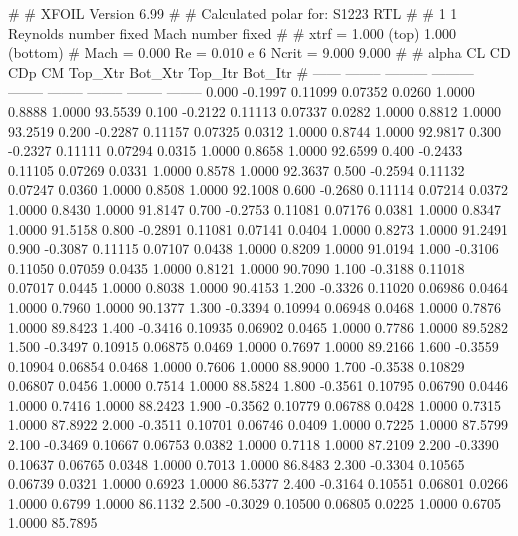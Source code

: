 #  
#       XFOIL         Version 6.99
#  
# Calculated polar for: S1223 RTL                                       
#  
# 1 1 Reynolds number fixed          Mach number fixed         
#  
# xtrf =   1.000 (top)        1.000 (bottom)  
# Mach =   0.000     Re =     0.010 e 6     Ncrit =   9.000  9.000
#  
#   alpha    CL        CD       CDp       CM     Top_Xtr  Bot_Xtr  Top_Itr  Bot_Itr
#  ------ -------- --------- --------- -------- -------- -------- -------- --------
   0.000  -0.1997   0.11099   0.07352   0.0260   1.0000   0.8888   1.0000  93.5539
   0.100  -0.2122   0.11113   0.07337   0.0282   1.0000   0.8812   1.0000  93.2519
   0.200  -0.2287   0.11157   0.07325   0.0312   1.0000   0.8744   1.0000  92.9817
   0.300  -0.2327   0.11111   0.07294   0.0315   1.0000   0.8658   1.0000  92.6599
   0.400  -0.2433   0.11105   0.07269   0.0331   1.0000   0.8578   1.0000  92.3637
   0.500  -0.2594   0.11132   0.07247   0.0360   1.0000   0.8508   1.0000  92.1008
   0.600  -0.2680   0.11114   0.07214   0.0372   1.0000   0.8430   1.0000  91.8147
   0.700  -0.2753   0.11081   0.07176   0.0381   1.0000   0.8347   1.0000  91.5158
   0.800  -0.2891   0.11081   0.07141   0.0404   1.0000   0.8273   1.0000  91.2491
   0.900  -0.3087   0.11115   0.07107   0.0438   1.0000   0.8209   1.0000  91.0194
   1.000  -0.3106   0.11050   0.07059   0.0435   1.0000   0.8121   1.0000  90.7090
   1.100  -0.3188   0.11018   0.07017   0.0445   1.0000   0.8038   1.0000  90.4153
   1.200  -0.3326   0.11020   0.06986   0.0464   1.0000   0.7960   1.0000  90.1377
   1.300  -0.3394   0.10994   0.06948   0.0468   1.0000   0.7876   1.0000  89.8423
   1.400  -0.3416   0.10935   0.06902   0.0465   1.0000   0.7786   1.0000  89.5282
   1.500  -0.3497   0.10915   0.06875   0.0469   1.0000   0.7697   1.0000  89.2166
   1.600  -0.3559   0.10904   0.06854   0.0468   1.0000   0.7606   1.0000  88.9000
   1.700  -0.3538   0.10829   0.06807   0.0456   1.0000   0.7514   1.0000  88.5824
   1.800  -0.3561   0.10795   0.06790   0.0446   1.0000   0.7416   1.0000  88.2423
   1.900  -0.3562   0.10779   0.06788   0.0428   1.0000   0.7315   1.0000  87.8922
   2.000  -0.3511   0.10701   0.06746   0.0409   1.0000   0.7225   1.0000  87.5799
   2.100  -0.3469   0.10667   0.06753   0.0382   1.0000   0.7118   1.0000  87.2109
   2.200  -0.3390   0.10637   0.06765   0.0348   1.0000   0.7013   1.0000  86.8483
   2.300  -0.3304   0.10565   0.06739   0.0321   1.0000   0.6923   1.0000  86.5377
   2.400  -0.3164   0.10551   0.06801   0.0266   1.0000   0.6799   1.0000  86.1132
   2.500  -0.3029   0.10500   0.06805   0.0225   1.0000   0.6705   1.0000  85.7895
